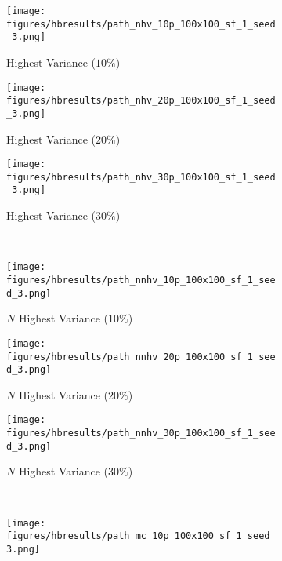 \begin{figure}[htb!]
    \centering
        \begin{subfigure}[t]{0.32\textwidth}
        \centering
        \texttt{[image: figures/hbresults/path\_nhv\_10p\_100x100\_sf\_1\_seed\_3.png]}
        \ssp
        \captionsetup{skip=0.20\baselineskip,size=footnotesize}
        \caption{Highest Variance ($10\%$)}
    \end{subfigure}%
    \begin{subfigure}[t]{0.32\textwidth}
        \centering
        \texttt{[image: figures/hbresults/path\_nhv\_20p\_100x100\_sf\_1\_seed\_3.png]}
        \ssp
        \captionsetup{skip=0.20\baselineskip,size=footnotesize}
        \caption{Highest Variance ($20\%$)}
    \end{subfigure}%
    \begin{subfigure}[t]{0.32\textwidth}
        \centering
        \texttt{[image: figures/hbresults/path\_nhv\_30p\_100x100\_sf\_1\_seed\_3.png]}
        \ssp
        \captionsetup{skip=0.20\baselineskip,size=footnotesize}
        \caption{Highest Variance ($30\%$)}
    \end{subfigure}%
    \\
    \begin{subfigure}[t]{0.32\textwidth}
        \centering
        \texttt{[image: figures/hbresults/path\_nnhv\_10p\_100x100\_sf\_1\_seed\_3.png]}
        \ssp
        \captionsetup{skip=0.20\baselineskip,size=footnotesize}
        \caption{$N$ Highest Variance ($10\%$)}
    \end{subfigure}%
    \begin{subfigure}[t]{0.32\textwidth}
        \centering
        \texttt{[image: figures/hbresults/path\_nnhv\_20p\_100x100\_sf\_1\_seed\_3.png]}
        \ssp
        \captionsetup{skip=0.20\baselineskip,size=footnotesize}
        \caption{$N$ Highest Variance ($20\%$)}
    \end{subfigure}%
    \begin{subfigure}[t]{0.32\textwidth}
        \centering
        \texttt{[image: figures/hbresults/path\_nnhv\_30p\_100x100\_sf\_1\_seed\_3.png]}
        \ssp
        \captionsetup{skip=0.20\baselineskip,size=footnotesize}
        \caption{$N$ Highest Variance ($30\%$)}
    \end{subfigure}%
    \\
    \begin{subfigure}[t]{0.32\textwidth}
        \centering
        \texttt{[image: figures/hbresults/path\_mc\_10p\_100x100\_sf\_1\_seed\_3.png]}

\end{subfigure}
\end{figure}
